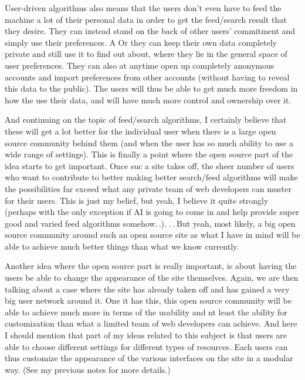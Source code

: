 \documentclass{report}
\begin{document}
User-driven algorithms also means that the users don't even have to feed the machine a lot of their personal data in order to get the feed/search result that they desire. They can instead stand on the back of other users' commitment and simply use their preferences. A
Or they can keep their own data completely private and still use it to find out about, where they lie in the general space of user preferences. They can also at anytime open up completely anonymous accounts and import preferences from other accounts (without having to reveal this data to the public). The users will thus be able to get much more freedom in how the use their data, and will have much more control and ownership over it.

And continuing on the topic of feed/search algorithms, I certainly believe that these will get a lot better for the individual user when there is a large open source community behind them (and when the user has so much ability to use a wide range of settings). This is finally a point where the open source part of the idea starts to get important. Once suc a site takes off, the sheer number of users who want to contribute to better making better search/feed algorithms will make the possibilities far exceed what any private team of web developers can muster for their users. This is just my belief, but yeah, I believe it quite strongly (perhaps with the only exception if AI is going to come in and help provide super good and varied feed algorithms somehow.\,.). .\,.\,But yeah, most likely, a big open source community around such an open source site as what I have in mind will be able to achieve much better things than what we know currently.

Another idea where the open source part is really important, is about having the users be able to change the appearance of the site themselves. Again, we are then talking about a case where the site has already taken off and has gained a very big user network around it. One it has this, this open source community will be able to achieve much more in terms of the usability and nt least the ability for customization than what a limited team of web developers can achieve. And here I should mention that part of my ideas related to this subject is that users are able to choose different settings for different types of resources. Each users can thus customize the appearance of the various interfaces on the site in a modular way. (See my previous notes for more details.)
\end{document}

